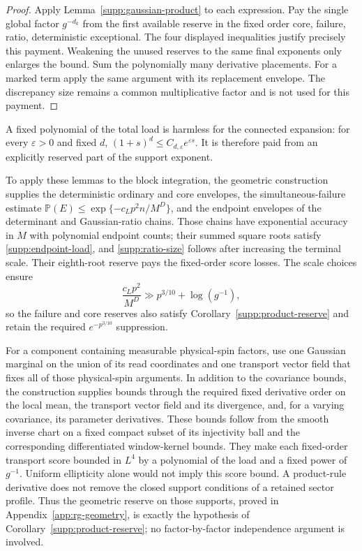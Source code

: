 \begin{proof}
Apply Lemma~\ref{supp:gaussian-product} to each expression.  Pay the
single global factor $g^{-d_k}$ from the first available reserve in
the fixed order core, failure, ratio, deterministic exceptional.
The four displayed inequalities
justify precisely this payment.  Weakening the unused reserves to the
same final exponents only enlarges the bound.  Sum the polynomially
many derivative placements.  For a marked term apply the same argument
with its replacement envelope.  The discrepancy size remains a common
multiplicative factor and is not used for this payment.
\end{proof}

A fixed polynomial of the total load is harmless for the connected
expansion: for every $\varepsilon>0$ and fixed $d$,
$(1+s)^d\le C_{d,\varepsilon}e^{\varepsilon s}$.  It is therefore paid
from an explicitly reserved part of the support exponent.

To apply these lemmas to the block integration, the geometric
construction supplies the deterministic ordinary and core envelopes,
the simultaneous-failure estimate
$\mathbb P(E)\le\exp\{-c_Lp^2n/M^D\}$, and the endpoint envelopes of
the determinant and Gaussian-ratio chains.  Those chains have
exponential accuracy in $M$ with polynomial endpoint counts; their
summed square roots satisfy \eqref{supp:endpoint-load}, and
\eqref{supp:ratio-size} follows after increasing the terminal scale.
Their eighth-root reserve pays the fixed-order score losses.
The scale choices ensure
\[
 \frac{c_Lp^2}{M^D}\gg p^{3/10}+\log(g^{-1}),
\]
so the failure and core reserves also satisfy
Corollary~\ref{supp:product-reserve} and retain the required
$e^{-p^{3/10}}$ suppression.

For a component containing measurable physical-spin factors, use one
Gaussian marginal on the union of its read coordinates and one
transport vector field that fixes all of those physical-spin arguments.
In addition to the covariance bounds, the construction supplies bounds
through the required fixed derivative order on the local mean, the
transport vector field and its divergence, and, for a varying covariance,
its parameter derivatives.  These bounds follow from the smooth inverse
chart on a fixed compact subset of its injectivity ball and the
corresponding differentiated window-kernel bounds.  They make each
fixed-order transport score bounded in $L^4$ by a polynomial of the load
and a fixed power of $g^{-1}$.  Uniform ellipticity alone would not imply
this score bound.  A product-rule derivative does not remove
the closed support conditions of a retained sector profile.  Thus the
geometric reserve on those supports, proved in
Appendix~\ref{app:rg-geometry}, is exactly the
hypothesis of Corollary~\ref{supp:product-reserve}; no factor-by-factor
independence argument is involved.


